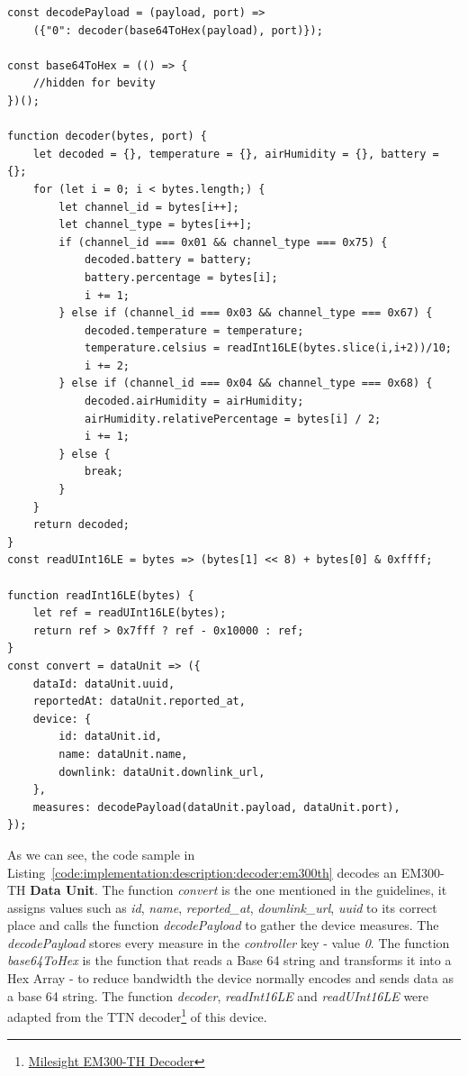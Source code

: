 \begin{lstlisting}[style=javascript, caption=EM300-TH Data Decoder Example, label={code:implementation:description:decoder:em300th}]
const decodePayload = (payload, port) =>
    ({"0": decoder(base64ToHex(payload), port)});

const base64ToHex = (() => {
    //hidden for bevity
})();

function decoder(bytes, port) {
    let decoded = {}, temperature = {}, airHumidity = {}, battery = {};
    for (let i = 0; i < bytes.length;) {
        let channel_id = bytes[i++];
        let channel_type = bytes[i++];
        if (channel_id === 0x01 && channel_type === 0x75) {
            decoded.battery = battery;
            battery.percentage = bytes[i];
            i += 1;
        } else if (channel_id === 0x03 && channel_type === 0x67) {
            decoded.temperature = temperature;
            temperature.celsius = readInt16LE(bytes.slice(i,i+2))/10;
            i += 2;
        } else if (channel_id === 0x04 && channel_type === 0x68) {
            decoded.airHumidity = airHumidity;
            airHumidity.relativePercentage = bytes[i] / 2;
            i += 1;
        } else {
            break;
        }
    }
    return decoded;
}
const readUInt16LE = bytes => (bytes[1] << 8) + bytes[0] & 0xffff;

function readInt16LE(bytes) {
    let ref = readUInt16LE(bytes);
    return ref > 0x7fff ? ref - 0x10000 : ref;
}
const convert = dataUnit => ({
    dataId: dataUnit.uuid,
    reportedAt: dataUnit.reported_at,
    device: {
        id: dataUnit.id,
        name: dataUnit.name,
        downlink: dataUnit.downlink_url,
    },
    measures: decodePayload(dataUnit.payload, dataUnit.port),
});
\end{lstlisting}

As we can see, the code sample in Listing~\ref{code:implementation:description:decoder:em300th} decodes an EM300-TH \textbf{Data Unit}. The function \textit{convert} is the one mentioned in the guidelines, it assigns values such as \textit{id}, \textit{name}, \textit{reported\_at}, \textit{downlink\_url}, \textit{uuid} to its correct place and calls the function \textit{decodePayload} to gather the device measures. The \textit{decodePayload} stores every measure in the \textit{controller} key - value \textit{0}. The function \textit{base64ToHex} is the function that reads a Base 64 string and transforms it into a Hex Array - to reduce bandwidth the device normally encodes and sends data as a base 64 string. The function \textit{decoder}, \textit{readInt16LE} and \textit{readUInt16LE} were adapted from the TTN decoder\footnote{\href {https://www.milesight-iot.com/lorawan/sensor/em300-th}{Milesight EM300-TH Decoder}} of this device.

